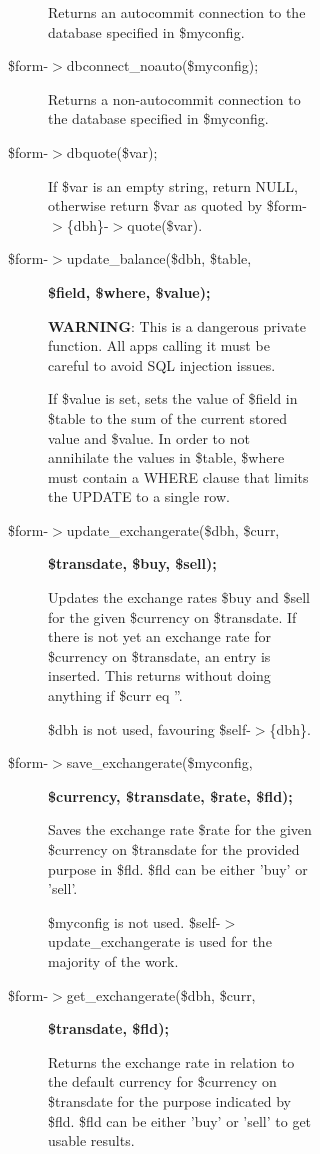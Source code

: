 \begin{description}
\begin{description}
\begin{description}
\begin{description}
\begin{description}
\begin{description}
Returns an autocommit connection to the database specified in \$myconfig.


\item[{\$form-$>$dbconnect\_noauto(\$myconfig);}] \mbox{}

Returns a non-autocommit connection to the database specified in \$myconfig.


\item[{\$form-$>$dbquote(\$var);}] \mbox{}

If \$var is an empty string, return NULL, otherwise return \$var as quoted by
\$form-$>$\{dbh\}-$>$quote(\$var).


\item[{\$form-$>$update\_balance(\$dbh, \$table,}] \textbf{\$field, \$where, \$value);}

\textbf{WARNING}: This is a dangerous private function.  All apps calling it must be
careful to avoid SQL injection issues.



If \$value is set, sets the value of \$field in \$table to the sum of the current
stored value and \$value.  In order to not annihilate the values in \$table,
\$where must contain a WHERE clause that limits the UPDATE to a single row.


\item[{\$form-$>$update\_exchangerate(\$dbh, \$curr,}] \textbf{\$transdate, \$buy, \$sell);}

Updates the exchange rates \$buy and \$sell for the given \$currency on \$transdate.
If there is not yet an exchange rate for \$currency on \$transdate, an entry is
inserted.  This returns without doing anything if \$curr eq ''.



\$dbh is not used, favouring \$self-$>$\{dbh\}.


\item[{\$form-$>$save\_exchangerate(\$myconfig,}] \textbf{\$currency, \$transdate, \$rate, \$fld);}

Saves the exchange rate \$rate for the given \$currency on \$transdate for the
provided purpose in \$fld.  \$fld can be either 'buy' or 'sell'.



\$myconfig is not used.  \$self-$>$update\_exchangerate is used for the majority of
the work.


\item[{\$form-$>$get\_exchangerate(\$dbh, \$curr,}] \textbf{\$transdate, \$fld);}

Returns the exchange rate in relation to the default currency for \$currency on
\$transdate for the purpose indicated by \$fld.  \$fld can be either 'buy' or
'sell' to get usable results.




\end{description}
\end{description}
\end{description}
\end{description}
\end{description}
\end{description}
